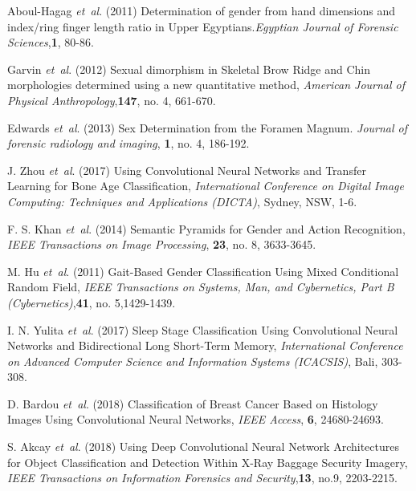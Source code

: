 \documentclass{bioinfo}
\begin{document}
\begin{thebibliography}{}
Aboul-Hagag  {\it et~al}. (2011) Determination of gender from hand dimensions and index/ring finger length ratio in Upper Egyptians.{\it Egyptian Journal of Forensic Sciences},{\bf 1}, 80-86.

Garvin {\it et~al}. (2012) Sexual dimorphism in Skeletal Brow Ridge and Chin morphologies determined using a new quantitative method, {\it American Journal of Physical Anthropology},{\bf 147}, no. 4, 661-670.

Edwards {\it et~al}. (2013) Sex Determination from the Foramen Magnum. {\it Journal of forensic radiology and imaging}, {\bf 1}, no. 4, 186-192.

J. Zhou  {\it et~al}. (2017) Using Convolutional Neural Networks and Transfer Learning for Bone Age Classification, {\it International Conference on Digital Image Computing: Techniques and Applications (DICTA)}, Sydney, NSW,  1-6.

 F. S. Khan {\it et~al}. (2014) Semantic Pyramids for Gender and Action Recognition, {\it IEEE Transactions on Image Processing}, {\bf 23}, no. 8, 3633-3645.
 
M. Hu {\it et~al}. (2011) Gait-Based Gender Classification Using Mixed Conditional Random Field,  {\it IEEE Transactions on Systems, Man, and Cybernetics, Part B (Cybernetics)},{\bf 41}, no. 5,1429-1439.

I. N. Yulita {\it et~al}. (2017) Sleep Stage Classification Using Convolutional Neural Networks and Bidirectional Long Short-Term Memory, {\it International Conference on Advanced Computer Science and Information Systems (ICACSIS)}, Bali, 303-308.

D. Bardou {\it et~al}. (2018) Classification of Breast Cancer Based on Histology Images Using Convolutional Neural Networks, {\it IEEE Access}, {\bf 6}, 24680-24693.

S. Akcay {\it et~al}. (2018) Using Deep Convolutional Neural Network Architectures for Object Classification and Detection Within X-Ray Baggage Security Imagery, {\it IEEE Transactions on Information Forensics and Security},{\bf 13}, no.9, 2203-2215.


\end{thebibliography}
\end{document}
